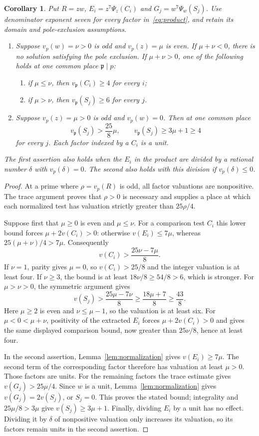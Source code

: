 \documentclass[11pt,a4paper]{article}
\newtheorem{corollary}[theorem]{Corollary}
\begin{document}
\begin{corollary}\label{cor:seven}
Put $R=zw$, $E_i=z^7\Psi_z(C_i)$ and $G_j=w^7\Psi_w(S_j)$.
Use denominator exponent seven for every factor in~\eqref{eq:product},
and retain its domain and pole-exclusion assumptions.
\begin{enumerate}
\item Suppose $v_p(w)=\nu>0$ is odd and $v_p(z)=\mu$ is even.
If $\mu+\nu<0$, there is no solution satisfying the pole exclusion.
If $\mu+\nu>0$, one of the following holds at one common place
$\mathfrak p\mid p$:
\begin{enumerate}
\item if $\mu\le\nu$, then $v_{\mathfrak p}(C_i)\ge4$ for every $i$;
\item if $\mu>\nu$, then $v_{\mathfrak p}(S_j)\ge6$ for every $j$.
\end{enumerate}
\item Suppose $v_p(z)=\mu>0$ is odd and $v_p(w)=0$.
Then at one common place
\[
          v_{\mathfrak p}(S_j)>\frac{25}{8}\mu,
          \qquad v_{\mathfrak p}(S_j)\ge3\mu+1\ge4
\]
for every $j$. Each factor indexed by a $C_i$ is a unit.
\end{enumerate}
The first assertion also holds when the $E_i$ in the product are
divided by a rational number $\delta$ with $v_p(\delta)=0$.
The second also holds with this division if $v_p(\delta)\le0$.
\end{corollary}
\begin{proof}
At a prime where $\rho=v_p(R)$ is odd, all factor valuations are
nonpositive. The trace argument proves that $\rho>0$ is necessary
and supplies a place at which each normalized test has valuation
strictly greater than $25\rho/4$.

Suppose first that $\mu\ge0$ is even and $\mu\le\nu$.
For a comparison test $C_i$ this lower bound forces
$\mu+2v(C_i)>0$: otherwise $v(E_i)\le7\mu$, whereas
$25(\mu+\nu)/4>7\mu$. Consequently
\[
               v(C_i)>\frac{25\nu-7\mu}{8}.
\]
If $\nu=1$, parity gives $\mu=0$, so $v(C_i)>25/8$ and the
integer valuation is at least four. If $\nu\ge3$, the bound
is at least $18\nu/8\ge54/8>6$, which is stronger.
For $\mu>\nu>0$, the symmetric argument gives
\[
               v(S_j)>\frac{25\mu-7\nu}{8}
                        \ge\frac{18\mu+7}{8}\ge\frac{43}{8}.
\]
Here $\mu\ge2$ is even and $\nu\le\mu-1$, so the valuation
is at least six. For $\mu<0<\mu+\nu$, positivity of the extracted
$E_i$ forces $\mu+2v(C_i)>0$ and gives the same displayed
comparison bound, now greater than $25\nu/8$, hence at least four.

In the second assertion, Lemma~\ref{lem:normalization} gives
$v(E_i)\ge7\mu$. The second term of the corresponding factor
therefore has valuation at least $\mu>0$. Those factors are units.
For the remaining factors the trace estimate gives
$v(G_j)>25\mu/4$. Since $w$ is a unit, Lemma~\ref{lem:normalization}
gives $v(G_j)=2v(S_j)$, or $S_j=0$. This proves the stated bound;
integrality and $25\mu/8>3\mu$ give $v(S_j)\ge3\mu+1$.
Finally, dividing $E_i$ by a unit has no effect. Dividing it by
$\delta$ of nonpositive valuation only increases its valuation,
so its factors remain units in the second assertion.
\end{proof}
\end{document}
